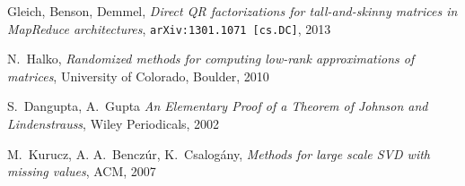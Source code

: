 \documentclass[11pt]{article}
\begin{document}
\begin{thebibliography}{1}

Gleich, Benson, Demmel, \emph{Direct QR factorizations for tall-and-skinny
  matrices in MapReduce architectures}, {\tt arXiv:1301.1071 [cs.DC]}, 2013

N.~Halko, \emph{Randomized methods for computing low-rank approximations of
  matrices}, University of Colorado, Boulder, 2010

S.~Dangupta, A.~Gupta \emph{An Elementary Proof of a Theorem of Johnson and
  Lindenstrauss}, Wiley Periodicals, 2002

M.~Kurucz, A. A.~Benczúr, K.~Csalogány, \emph{Methods for large scale SVD with
missing values}, ACM, 2007

\end{thebibliography}
\end{document}
